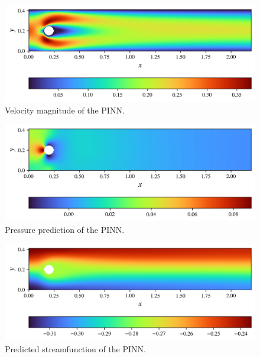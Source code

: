 \begin{figure}[h]
    \centering
    \includegraphics[width=\linewidth]{Project1XPINNs/figures/NavierStokes/NoDecomp/ND_10000_iter_30x25/solution/flow_magnitude_no_decomp.png}
    \caption{Velocity magnitude of the PINN.}
    \label{fig:NS_PINN_FlowMag}
\end{figure}

\begin{figure}[h]
    \centering
    \includegraphics[width=\linewidth]{Project1XPINNs/figures/NavierStokes/NoDecomp/ND_10000_iter_30x25/solution/pressure_no_decomp.png}
    \caption{Pressure prediction of the PINN.}
    \label{fig:NS_PINN_Pressure}
\end{figure}

\begin{figure}[h]
    \centering
    \includegraphics[width=\linewidth]{Project1XPINNs/figures/NavierStokes/NoDecomp/ND_10000_iter_30x25/solution/streamfunc_no_decomp.png}
    \caption{Predicted streamfunction of the PINN.}
    \label{fig:NS_PINN_Streamfunc}
\end{figure}

